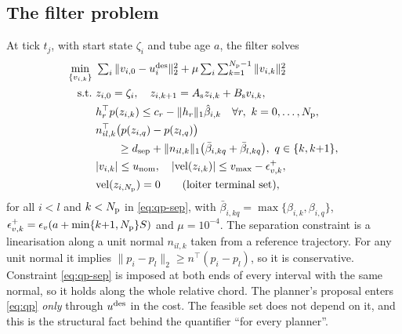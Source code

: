 \subsection{The filter problem}
At tick $t_j$, with start state $\zeta_i$ and tube age $a$, the filter solves
\begin{subequations}\label{eq:qp}
\begin{align}
\min_{\{v_{i,k}\}}\ & \textstyle\sum_{i}\|v_{i,0}-\uDes_i\|_2^2+\mu\sum_{i}\sum_{k=1}^{\Np-1}\|v_{i,k}\|_2^2 \label{eq:qp-cost}\\
\text{s.t.}\ & z_{i,0}=\zeta_i,\quad z_{i,k+1}=A_{\mathrm s}z_{i,k}+B_{\mathrm s}v_{i,k},\label{eq:qp-dyn}\\
& h_r^\top p(z_{i,k})\le c_r-\|h_r\|_1\hat\beta_{i,k}\quad \forall r,\ k=0,\dots,\Np,\label{eq:qp-cor}\\
& n_{il,k}^\top\bigl(p(z_{i,q})-p(z_{l,q})\bigr)\notag\\
& \qquad\ge\dsep+\|n_{il,k}\|_1\bigl(\bar\beta_{i,kq}+\bar\beta_{l,kq}\bigr),\ q\in\{k,k{+}1\},\label{eq:qp-sep}\\
& |v_{i,k}|\le\unom,\quad |\mathrm{vel}(z_{i,k})|\le\vmax-\epsilon_{v,k}^{+},\label{eq:qp-box}\\
& \mathrm{vel}(z_{i,\Np})=0\qquad\text{(loiter terminal set)},\label{eq:qp-term}
\end{align}
\end{subequations}
for all $i<l$ and $k<N_{\mathrm{p}}$ in \eqref{eq:qp-sep}, with $\bar\beta_{i,kq}=\max\{\beta_{i,k},\beta_{i,q}\}$, $\epsilon_{v,k}^{+}=\epsilon_v(a+\min\{k{+}1,N_{\mathrm{p}}\}S)$ and $\mu=10^{-4}$.
The separation constraint is a linearisation along a unit normal $n_{il,k}$
taken from a reference trajectory. For any unit normal it implies
$\|p_i-p_l\|_2\ge n^\top(p_i-p_l)$, so it is conservative. Constraint
\eqref{eq:qp-sep} is imposed at both ends of every interval with the same
normal, so it holds along the whole relative chord. The planner's proposal
enters \eqref{eq:qp} \emph{only} through $u^{\mathrm{des}}$ in the cost. The feasible
set does not depend on it, and this is the structural fact behind the
quantifier ``for every planner''.

